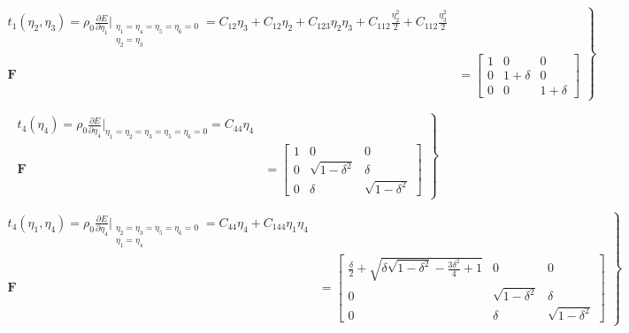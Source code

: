 \documentclass[showpacs,aps,floatfix,prb,reprint,superscriptaddress,onecolumn]{revtex4-1}
\begin{document}
\begin{enumerate}
\begin{equation}
\label{eqn:SM-hexs3}
  \left.\begin{aligned}
        t_{1} \left(\eta_{2}, \eta_{3}\right) = \rho_{0} \frac{\partial E}{\partial \eta_{1}}\Bigr|_{\substack{\eta_1=\eta_4=\eta_5=\eta_6=0 \\ \eta_{2}=\eta_{3}}} = C_{12}\eta_{3} + C_{12}\eta_{2} + C_{123}\eta_{2}\eta_{3} + C_{112}\frac{\eta_{2}^{2}}{2} + C_{112}\frac{\eta_{3}^{2}}{2} \\
        \bm{F}&=\begin{bmatrix} 1 & 0 & 0 \\ 0 & 1+\delta & 0 \\ 0 & 0 & 1+\delta \end{bmatrix}
       \end{aligned}
			\right\}
\end{equation}


\begin{equation}
\label{eqn:SM-hexs4}
  \left.\begin{aligned}
        t_{4} \left(\eta_{4}\right) = \rho_{0} \frac{\partial E}{\partial \eta_{4}}\Bigr|_{\eta_1=\eta_2=\eta_3=\eta_5=\eta_6=0} = C_{44}\eta_{4} \\
        \bm{F}&=\begin{bmatrix} 1 & 0 & 0 \\ 0 & \sqrt{1-\delta^2} & \delta \\ 0 & \delta & \sqrt{1-\delta^2} \end{bmatrix}
       \end{aligned}
			\right\}
\end{equation}


\begin{equation}
\label{eqn:SM-hexs5}
  \left.\begin{aligned}
        t_{4} \left(\eta_{1}, \eta_{4}\right) = \rho_{0} \frac{\partial E}{\partial \eta_{4}}\Bigr|_{\substack{\eta_2=\eta_3=\eta_5=\eta_6=0 \\ \eta_{1} = \eta_{4}}} = C_{44}\eta_{4} + C_{144}\eta_{1}\eta_{4} \\
        \bm{F}&=\begin{bmatrix} \frac{\delta}{2}+\sqrt{\delta \sqrt{1-\delta^2}-\frac{3 \delta^2}{4}+1} & 0 & 0 \\ 0 & \sqrt{1-\delta^2} & \delta \\ 0 & \delta & \sqrt{1-\delta^2} \end{bmatrix}
       \end{aligned}
			\right\}
\end{equation}



\end{enumerate}
\end{document}
